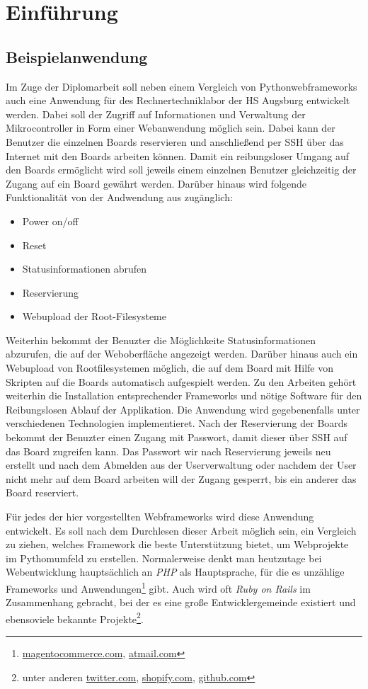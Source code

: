 \chapter{Einführung}
\section{Beispielanwendung}
Im Zuge der Diplomarbeit soll neben einem Vergleich von Pythonwebframeworks auch
eine Anwendung für des Rechnertechniklabor der HS Augsburg entwickelt werden.
Dabei soll der Zugriff auf Informationen und Verwaltung der Mikrocontroller in
Form einer Webanwendung möglich sein. Dabei kann der Benutzer die einzelnen
Boards reservieren und anschließend per SSH über das Internet mit den Boards
arbeiten können. Damit ein reibungsloser Umgang auf den Boards ermöglicht wird
soll jeweils einem einzelnen Benutzer gleichzeitig der Zugang auf ein Board 
gewährt werden. Darüber hinaus wird folgende Funktionalität von der Andwendung 
aus zugänglich:

\begin{itemize}
  \item Power on/off
  \item Reset
  \item Statusinformationen abrufen
  \item Reservierung
  \item Webupload der Root-Filesysteme
\end{itemize}

Weiterhin bekommt der Benuzter die Möglichkeite Statusinformationen abzurufen, 
die auf der Weboberfläche angezeigt werden. Darüber hinaus auch ein Webupload
von Rootfilesystemen möglich, die auf dem Board mit Hilfe von Skripten auf die
Boards automatisch aufgespielt werden. Zu den Arbeiten gehört weiterhin die
Installation entsprechender Frameworks und nötige Software für den
Reibungslosen Ablauf der Applikation. Die Anwendung wird gegebenenfalls unter
verschiedenen Technologien implementieret. Nach der Reservierung der Boards
bekommt der Benuzter einen Zugang mit Passwort, damit dieser über SSH auf das
Board zugreifen kann. Das Passwort wir nach Reservierung jeweils neu erstellt
und nach dem Abmelden aus der Userverwaltung oder nachdem der User nicht mehr
auf dem Board arbeiten will der Zugang gesperrt, bis ein anderer das Board
reserviert. 

Für jedes der hier vorgestellten Webframeworks wird diese Anwendung entwickelt.
Es soll nach dem Durchlesen dieser Arbeit möglich sein, ein Vergleich zu ziehen,
welches Framework die beste Unterstützung bietet, um Webprojekte im
Pythomumfeld zu erstellen. Normalerweise denkt man heutzutage bei
Webentwicklung hauptsächlich an \emph{PHP} als Hauptsprache, für die es
unzählige Frameworks und Anwendungen\footnote{\url{magentocommerce.com},
\url{atmail.com}} gibt. Auch wird oft \emph{Ruby on Rails} im Zusammenhang
gebracht, bei der es eine große Entwicklergemeinde existiert und ebensoviele 
bekannte Projekte\footnote{unter anderen \url{twitter.com}, \url{shopify.com}, 
\url{github.com}}.

